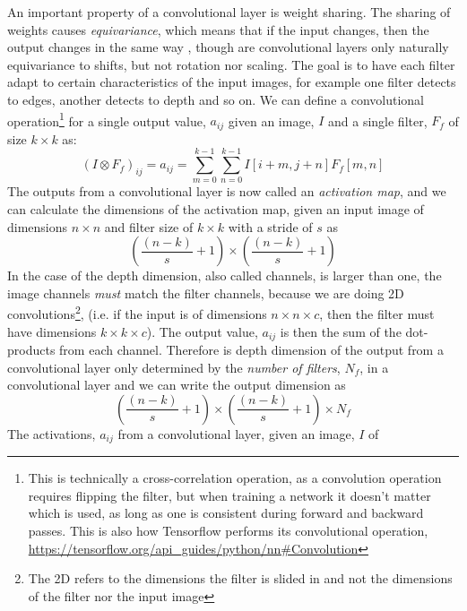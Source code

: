 An important property of a convolutional layer is weight sharing. The sharing of
weights causes  \emph{equivariance}, which means that if the input changes, then
the output changes in the same way \cite[ch. 9]{Goodfellow-et-al-2016}, though
are convolutional layers only naturally equivariance to shifts, but not rotation
nor scaling. The goal is to have each filter adapt to certain characteristics of
the input images, for example one filter detects to edges, another detects to
depth and so on. We can define a convolutional operation\footnote{This is
	technically a cross-correlation operation, as a convolution operation requires
	flipping the filter, but when training a network it doesn't matter which is
	used, as long as one is consistent during forward and backward passes. This is
	also how Tensorflow performs its convolutional operation,
	\url{https://tensorflow.org/api_guides/python/nn\#Convolution}} for a single
output value, $a_{ij}$ given an image, $I$ and a single filter, $F_f$ of size
$k\times k$ as:
\begin{equation}
(I \otimes F_f)_{ij} = a_{ij}  = \sum_{m=0}^{k-1}\sum_{n=0}^{k-1} I[i+m, j+n]
F_f[m,n]
\end{equation}
The outputs from a convolutional layer is now called an \emph{activation map},
and we can calculate the dimensions of the activation map, given an input image
of dimensions $n\times n$ and filter size of $k \times k$ with a stride of $s$
as 
\begin{equation}
\left(\frac{(n - k)}{s}  + 1\right) \times \left(\frac{(n - k)}{s}  + 1\right)
\end{equation}  
In the case of the depth dimension, also called channels,  is larger than one,
the image channels \emph{must} match the filter channels, because we are doing
2D convolutions\footnote{The 2D refers to the dimensions the filter is slided in
	and not the dimensions of the filter nor the input image}, (i.e. if the input is
of dimensions $n \times n \times c$, then the filter must have dimensions $k
\times k \times c$). The output value, $a_{ij}$ is then the sum of the
dot-products from each channel. Therefore is depth dimension of the output from
a convolutional layer only determined by the \emph{number of filters}, $N_f$, in
a convolutional layer and we can write the output dimension as
\begin{equation}
\left(\frac{(n - k)}{s}  + 1\right) \times \left(\frac{(n - k)}{s}  + 1\right)
\times N_f
\end{equation} 
The activations, $a_{ij}$ from a convolutional layer, given an image, $I$ of
